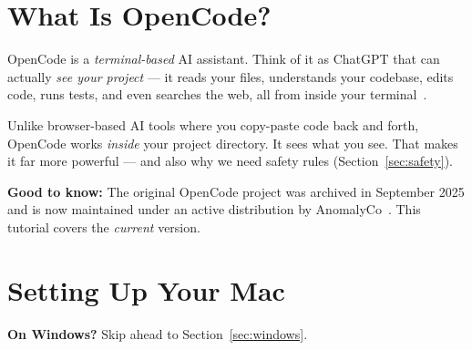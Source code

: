 \documentclass[11pt]{article}
\begin{document}
\section{What Is OpenCode?}

OpenCode is a \emph{terminal-based} AI assistant.  Think of it as ChatGPT that can actually \emph{see your project} --- it reads your files, understands your codebase, edits code, runs tests, and even searches the web, all from inside your terminal~\cite{opencode2025,opencode_readme2025}.

\begin{def-box}
Unlike browser-based AI tools where you copy-paste code back and forth, OpenCode works \emph{inside} your project directory.  It sees what you see.  That makes it far more powerful --- and also why we need safety rules (Section~\ref{sec:safety}).
\end{def-box}

\begin{alert-box}
\textbf{Good to know:} The original OpenCode project was archived in September 2025 and is now maintained under an active distribution by AnomalyCo~\cite{anomalyco_opencode2026,opencode_install2026}.  This tutorial covers the \emph{current} version.
\end{alert-box}

\section{Setting Up Your Mac}

\begin{alert-box}
\textbf{On Windows?} Skip ahead to Section~\ref{sec:windows}.
\end{alert-box}

\begin{center}
\end{center}
\end{document}
